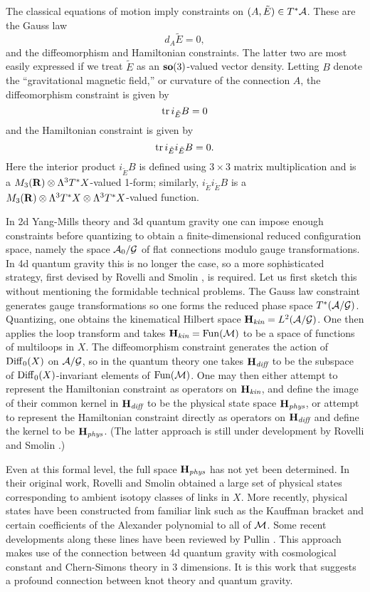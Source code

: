 \documentclass[12pt]{article}
\newcommand{\tensor}{\otimes}
\newcommand{\A}{{\cal A}}
\newcommand{\G}{{\cal G}}
\newcommand{\M}{{\cal M}}
\renewcommand{\H}{{\bf H}}
\newcommand{\so}{{\bf so}}      %
\newcommand{\R}{{\bf R}}
\newcommand{\tr}{{\rm tr}}
\newcommand{\Diff}{{\rm Diff}}
\newcommand{\Fun}{{\rm Fun}}
\begin{document}
The classical equations of motion imply constraints on $(A,\tilde E) \in
T^\ast \A$.  These are the Gauss law
\[          d_A \tilde E = 0, \]
and the diffeomorphism and Hamiltonian constraints.  The latter two are
most easily expressed if we treat $\tilde E$ as an $\so(3)$-valued
vector density.    Letting $B$ denote the ``gravitational magnetic field,'' or
curvature of the connection $A$, the diffeomorphism constraint is given
by
\[      \tr \,i_{\tilde E} B = 0 \]
and the Hamiltonian constraint is given by
\[      \tr\, i_{\tilde E} i_{\tilde E} B = 0 .\]
Here the interior product $i_{\tilde E} B$ is defined using $3\times 3$ matrix
multiplication and is a $M_3(\R) \tensor \Lambda^3 T^\ast X$-valued 1-form;
similarly, $i_{\tilde E} i_{\tilde E} B$ is a $M_3(\R) \tensor \Lambda^3
T^\ast X \tensor \Lambda^3 T^\ast X$-valued function.


In 2d Yang-Mills theory and 3d quantum gravity one can impose enough
constraints before quantizing to obtain a finite-dimensional reduced
configuration space, namely the space $\A_0/\G$ of flat connections modulo
gauge transformations.  In 4d quantum gravity this is no longer the case,
so a more sophisticated strategy, first devised by Rovelli
and Smolin \cite{RS}, is required.  Let us first sketch this without
mentioning the
formidable technical problems.   The Gauss law constraint generates gauge
transformations so one forms the reduced phase space $T^\ast(\A/\G)$.
Quantizing, one obtains the kinematical Hilbert space $\H_{\textit{kin}} =
L^2(\A/\G)$.  One then applies the loop transform and takes
$\H_{\textit{kin}} = \Fun(\M)$ to be a space of functions of multiloops in $X$.  The
diffeomorphism constraint generates the action of $\Diff_0(X)$ on $\A/\G$,
so in the quantum theory one takes $\H_{\textit{diff}}$ to be the subspace of
$\Diff_0(X)$-invariant elements of $\Fun(\M)$.  One may then either attempt
to represent the Hamiltonian constraint as operators on $\H_{\textit{kin}}$, and
define the image of their common kernel in $\H_{\textit{diff}}$ to be the physical
state space $\H_{\textit{phys}}$, or attempt to represent the Hamiltonian constraint
directly as operators on $\H_{\textit{diff}}$ and define the kernel to be
$\H_{\textit{phys}}$.  (The latter approach is still under development by Rovelli
and Smolin \cite{RS2}.)

Even at this formal level, the full space $\H_{\textit{phys}}$ has not yet been
determined.  In their original work, Rovelli and Smolin \cite{RS} obtained
a large set of physical states corresponding to ambient isotopy classes of
links in $X$.  More recently, physical states have been constructed from
familiar link such as the Kauffman bracket and certain coefficients of the
Alexander polynomial to all of $\M$.   Some recent developments along these
lines have been reviewed by Pullin \cite{Pullin}.  This approach makes use
of the connection between 4d quantum gravity with cosmological constant and
Chern-Simons theory in 3 dimensions.   It is this work that suggests a
profound connection between knot theory and quantum gravity.
\end{document}
